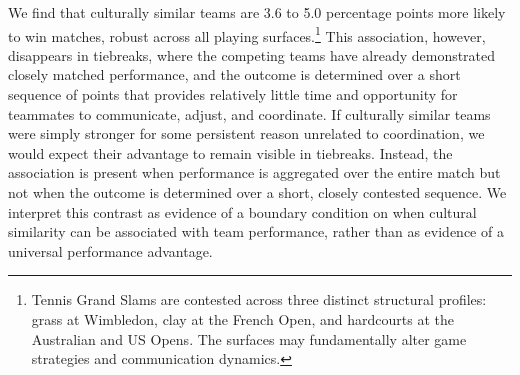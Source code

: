 \documentclass[10pt]{article}
\begin{document}
We find that culturally similar teams are 3.6 to 5.0 percentage points more likely to win matches, robust across all playing surfaces.\footnote{Tennis Grand Slams are contested across three distinct structural profiles: grass at Wimbledon, clay at the French Open, and hardcourts at the Australian and US Opens. The surfaces may fundamentally alter game strategies and communication dynamics.} This association, however, disappears in tiebreaks, where the competing teams have already demonstrated closely matched performance, and the outcome is determined over a short sequence of points that provides relatively little time and opportunity for teammates to communicate, adjust, and coordinate. %
If culturally similar teams were simply stronger for some persistent reason unrelated to coordination, we would expect their advantage to remain visible in tiebreaks. Instead, the association is present when performance is aggregated over the entire match but not when the outcome is determined over a short, closely contested sequence. We interpret this contrast as evidence of a boundary condition on when cultural similarity can be associated with team performance, rather than as evidence of a universal performance advantage.



\end{document}
